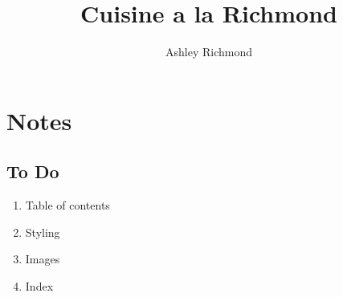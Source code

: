 \documentclass[a4paper]{book}
\title{Cuisine a la Richmond}
\author{Ashley Richmond}
\begin{document}
\maketitle

\chapter{Notes}
  \clearpage

  \section{To Do}
    \begin{enumerate}
      \item Table of contents
      \item Styling
      \item Images
      \item Index
    \end{enumerate}

%




\end{document}
